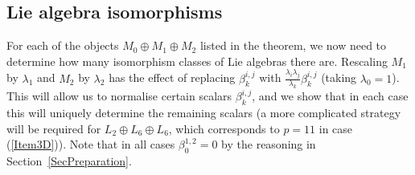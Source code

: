 \documentclass[11pt,a4paper,reqno]{amsart}
\theoremstyle{definition}
\numberwithin{equation}{section}
\begin{document}
\subsection{Lie algebra isomorphisms}\label{SecIsomorph} For each of the objects $M_0\oplus M_1\oplus M_2$ listed in the theorem, we now need to determine how many isomorphism classes of Lie algebras there are. Rescaling $M_1$ by $\lambda_1$ and $M_2$ by $\lambda_2$ has the effect of replacing $\beta^{i,j}_k$ with $\frac{\lambda_i\lambda_j}{\lambda_k}\beta^{i,j}_k$ (taking $\lambda_0=1$). This will allow us to normalise certain scalars $\beta^{i,j}_k$, and we show that in each case this will uniquely determine the remaining scalars (a more complicated strategy will be required for $L_2\oplus L_6\oplus L_6$, which corresponds to $p=11$ in case (\ref{Item3D})). Note that in all cases $\beta^{1,2}_0=0$ by the reasoning in Section~\ref{SecPreparation}.
\end{document}

